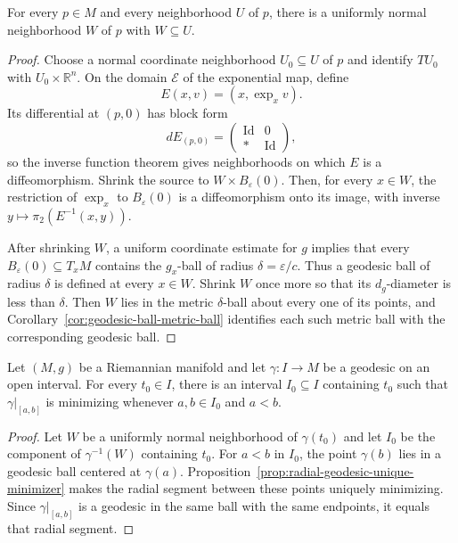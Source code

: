 \begin{lemma}
\label{lem:uniformly-normal-neighborhood}
For every $p\in M$ and every neighborhood $U$ of $p$, there is a uniformly
normal neighborhood $W$ of $p$ with $W\subseteq U$.
\end{lemma}

\begin{proof}
\sketch Choose a normal coordinate neighborhood $U_0\subseteq U$ of $p$ and
identify $TU_0$ with $U_0\times\mathbb R^n$. On the domain $\mathcal E$ of the
exponential map, define
\[
E(x,v)=(x,\exp_xv).
\]
Its differential at $(p,0)$ has block form
\[
dE_{(p,0)}=
\begin{pmatrix}
\operatorname{Id}&0\\
*&\operatorname{Id}
\end{pmatrix},
\]
so the inverse function theorem gives neighborhoods on which $E$ is a
diffeomorphism. Shrink the source to $W\times B_\varepsilon(0)$. Then, for
every $x\in W$, the restriction of $\exp_x$ to $B_\varepsilon(0)$ is a
diffeomorphism onto its image, with inverse
$y\mapsto\pi_2(E^{-1}(x,y))$.

After shrinking $W$, a uniform coordinate estimate for $g$ implies that every
$B_\varepsilon(0)\subseteq T_xM$ contains the $g_x$-ball of radius
$\delta=\varepsilon/c$. Thus a geodesic ball of radius $\delta$ is defined at
every $x\in W$. Shrink $W$ once more so that its $d_g$-diameter is less than
$\delta$. Then $W$ lies in the metric $\delta$-ball about every one of its
points, and Corollary~\ref{cor:geodesic-ball-metric-ball} identifies each such
metric ball with the corresponding geodesic ball.
\end{proof}

\begin{theorem}
\label{thm:locally-minimizing-geodesics}
Let $(M,g)$ be a Riemannian manifold and let $\gamma\colon I\to M$ be a
geodesic on an open interval. For every $t_0\in I$, there is an interval
$I_0\subseteq I$ containing $t_0$ such that $\gamma|_{[a,b]}$ is minimizing
whenever $a,b\in I_0$ and $a<b$.
\end{theorem}

\begin{proof}
\sketch Let $W$ be a uniformly normal neighborhood of $\gamma(t_0)$ and let
$I_0$ be the component of $\gamma^{-1}(W)$ containing $t_0$. For
$a<b$ in $I_0$, the point $\gamma(b)$ lies in a geodesic ball centered at
$\gamma(a)$. Proposition~\ref{prop:radial-geodesic-unique-minimizer} makes the
radial segment between these points uniquely minimizing. Since
$\gamma|_{[a,b]}$ is a geodesic in the same ball with the same endpoints, it
equals that radial segment.
\end{proof}

